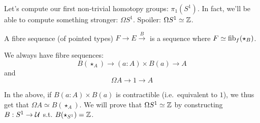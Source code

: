 \documentclass[10pt,oneside,leqno,openright]{memoir}
\begin{document}



Let's compute our first non-trivial homotopy groups: $\pi_1(S^1)$. In fact, we'll be able to compute something stronger: $\Omega S^1$. Spoiler: $\Omega S^1 \simeq \mathbb{Z}$.
%
\begin{definition}
  A fibre sequence (of pointed types) $F \to E \xrightarrow B$ is a sequence where $F \simeq \operatorname{fib}_f(\star_B)$. 
\end{definition}
\begin{fact}
  We always have fibre sequences:
  \[B(\star_A) \to (a :A) \times B(a) \to A\]
  and
  \[\Omega A \to 1 \to A\]
\end{fact}
%
In the above, if $B(a : A) \times B(a)$ is contractible (i.e.\ equivalent to $1$), we thus get that $\Omega A \simeq B(\star_A)$.
%
We will prove that $\Omega S^1 \simeq \mathbb{Z}$ by constructing $B : S^1 \to \mathcal{U}$ s.t. $B(\star_{S^1}) = \mathbb{Z}$.




\end{document}
